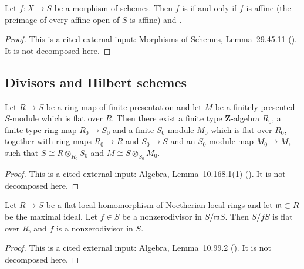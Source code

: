 \begin{lemma}
\label{lem:pc-affine-proper-finite}
Let $f:X\to S$ be a morphism of schemes.  Then $f$ is
 if and only if $f$ is
affine (the preimage of every affine open of $S$ is affine) and
.
\end{lemma}
\begin{proof}
This is a cited external input: Morphisms of Schemes, Lemma~29.45.11
().  It is not decomposed here.
\end{proof}


\subsection{Divisors and Hilbert schemes}

\begin{lemma}
\label{lem:pc-flat-fp-noetherian-descent}
Let $R\to S$ be a ring map of finite presentation and let $M$ be a
finitely presented $S$-module which is flat over $R$.  Then there exist
a finite type $\mathbf Z$-algebra $R_0$, a finite type ring map
$R_0\to S_0$ and a finite $S_0$-module $M_0$ which is flat over $R_0$,
together with ring maps $R_0\to R$ and $S_0\to S$ and an $S_0$-module
map $M_0\to M$, such that $S\cong R\otimes_{R_0}S_0$ and
$M\cong S\otimes_{S_0}M_0$.
\end{lemma}
\begin{proof}
This is a cited external input: Algebra, Lemma~10.168.1(1)
().  It is not decomposed here.
\end{proof}

\begin{lemma}
\label{lem:pc-flat-local-fibre-nzd}
Let $R\to S$ be a flat local homomorphism of Noetherian local rings and
let $\mathfrak m\subset R$ be the maximal ideal.  Let $f\in S$ be a
nonzerodivisor in $S/\mathfrak mS$.  Then $S/fS$ is flat over $R$, and
$f$ is a nonzerodivisor in $S$.
\end{lemma}
\begin{proof}
This is a cited external input: Algebra, Lemma~10.99.2
().  It is not decomposed here.
\end{proof}

